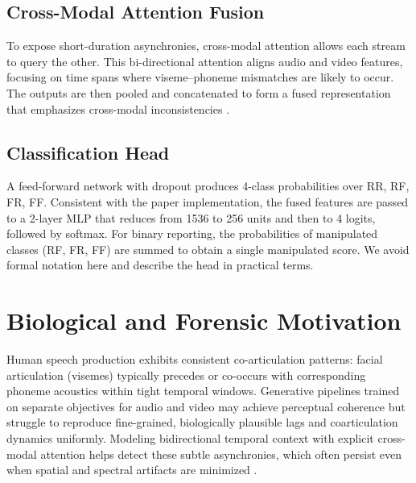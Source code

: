 \subsection{Cross-Modal Attention Fusion}
To expose short-duration asynchronies, cross-modal attention allows each stream to query the other. This bi-directional attention aligns audio and video features, focusing on time spans where viseme–phoneme mismatches are likely to occur. The outputs are then pooled and concatenated to form a fused representation that emphasizes cross-modal inconsistencies \cite{katamneni2024ijcb,chen2023icassp}.

\subsection{Classification Head}
A feed-forward network with dropout produces 4-class probabilities over {RR, RF, FR, FF}. Consistent with the paper implementation, the fused features are passed to a 2-layer MLP that reduces from 1536 to 256 units and then to 4 logits, followed by softmax. For binary reporting, the probabilities of manipulated classes (RF, FR, FF) are summed to obtain a single manipulated score. We avoid formal notation here and describe the head in practical terms.

\section{Biological and Forensic Motivation}
Human speech production exhibits consistent co-articulation patterns: facial articulation (visemes) typically precedes or co-occurs with corresponding phoneme acoustics within tight temporal windows. Generative pipelines trained on separate objectives for audio and video may achieve perceptual coherence but struggle to reproduce fine-grained, biologically plausible lags and coarticulation dynamics uniformly. Modeling bidirectional temporal context with explicit cross-modal attention helps detect these subtle asynchronies, which often persist even when spatial and spectral artifacts are minimized \cite{haliassos2021lips}.

